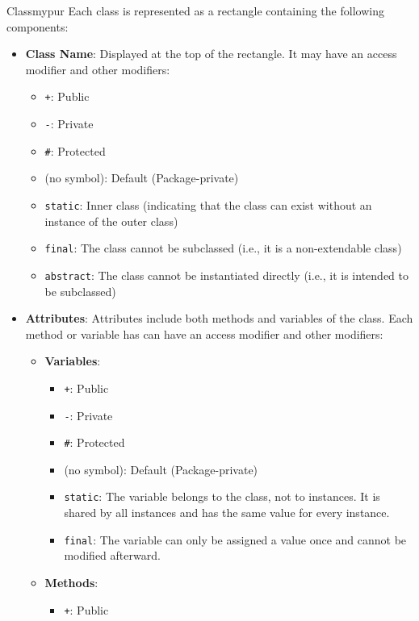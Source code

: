 \begin{prettyBox}{Class}{mypur}
Each class is represented as a rectangle containing the following components:
\begin{itemize}
    \item \textbf{Class Name}: Displayed at the top of the rectangle. It may have an access modifier and other modifiers:
    \begin{itemize}
        \item \texttt{+}: Public
        \item \texttt{-}: Private
        \item \texttt{\#}: Protected
        \item (no symbol): Default (Package-private)
        \item \texttt{static}: Inner class (indicating that the class can exist without an instance of the outer class)
        \item \texttt{final}: The class cannot be subclassed (i.e., it is a non-extendable class)
        \item \texttt{abstract}: The class cannot be instantiated directly (i.e., it is intended to be subclassed)
    \end{itemize}
    \item \textbf{Attributes}: Attributes include both methods and variables of the class. Each method or variable has can have an access modifier and other modifiers:
        \begin{itemize}
            \item \textbf{Variables}: 
            \begin{itemize}
                \item \texttt{+}: Public
                \item \texttt{-}: Private
                \item \texttt{\#}: Protected
                \item (no symbol): Default (Package-private)
                \item \texttt{static}: The variable belongs to the class, not to instances. It is shared by all instances and has the same value for every instance.
                \item \texttt{final}: The variable can only be assigned a value once and cannot be modified afterward.
            \end{itemize}
            \item \textbf{Methods}: 
            \begin{itemize}
                \item \texttt{+}: Public

\end{itemize}
\end{itemize}
\end{itemize}
\end{prettyBox}
